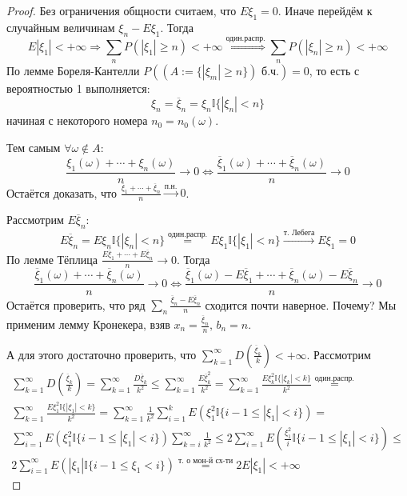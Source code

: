 \begin{proof}
	Без ограничения общности считаем, что $E\xi_1 = 0$. Иначе перейдём к случайным величинам $\xi_n - E\xi_1$. Тогда
	\[E|\xi_1| < +\infty \Rightarrow \sum_n P(|\xi_1| \geq n) < +\infty \stackrel{\text{один.распр.}}{\Leftrightarrow} \sum_n P(|\xi_n| \geq n) < +\infty\]
	По лемме Бореля-Кантелли $P((A:= \{|\xi_m| \geq n\}) \text{ б.ч.}) = 0$, то есть с вероятностью 1 выполняется:
	\[\xi_n = \overline{\xi}_n = \xi_n\mathbb{I}\{|\xi_n| < n\}\]
	начиная с некоторого номера $n_0 = n_0(\omega)$.

	Тем самым $\forall \omega \not\in A$:
	\[\frac{\xi_1(\omega) + \cdots + \xi_n(\omega)}{n} \to 0 \Leftrightarrow \frac{\overline{\xi}_1(\omega) + \cdots + \overline{\xi}_n(\omega)}{n} \to 0\]
	Остаётся доказать, что $\frac{\overline{\xi}_1 + \cdots + \overline{\xi}_n}{n} \stackrel{\text{п.н.}}{\to} 0$.

	Рассмотрим $E\overline{\xi}_n$:
	\[E\overline{\xi}_n = E\xi_n\mathbb{I}\{|\xi_n| < n\} \stackrel{\text{один.распр.}}{=} E\xi_1\mathbb{I}\{|\xi_1| < n\} \stackrel{\text{т. Лебега}}{\to} E\xi_1 = 0\]
	По лемме Тёплица $\frac{E\overline{\xi}_1 + \cdots + E\overline{\xi}_n}{n} \to 0$. Тогда
	\[\frac{\overline{\xi}_1(\omega) + \cdots + \overline{\xi}_n(\omega)}{n} \to 0 \Leftrightarrow \frac{\overline{\xi}_1(\omega) - E\overline{\xi}_1 + \cdots + \overline{\xi}_n(\omega) - E\overline{\xi}_n}{n} \to 0\]
	Остаётся проверить, что ряд $\sum_n \frac{\overline{\xi}_n - E\overline{\xi}_n}{n}$ сходится почти наверное. Почему? Мы применим лемму Кронекера, взяв $x_n = \frac{\overline{\xi}_n}{n},\, b_n = n$.

	А для этого достаточно проверить, что $\sum_{k = 1}^\infty D\left(\frac{\overline{\xi}_k}{k}\right) < +\infty$. Рассмотрим
	\begin{align*}
		\sum_{k = 1}^\infty D\left(\frac{\overline{\xi}_k}{k}\right) = \sum_{k = 1}^\infty \frac{D\overline{\xi}_k}{k^2} \leq \sum_{k = 1}^\infty \frac{E\overline{\xi}_k^2}{k^2} = \sum_{k = 1}^\infty \frac{E\xi_k^2\mathbb{I}\{|\xi_k| < k\}}{k^2} \stackrel{\text{один.распр.}}{=} \\
		\sum_{k = 1}^\infty \frac{E\xi_1^2\mathbb{I}\{|\xi_1| < k\}}{k^2} = \sum_{k = 1}^\infty \frac{1}{k^2}\sum_{i = 1}^k E\left(\xi_1^2\mathbb{I}\{i - 1 \leq |\xi_1| < i\}\right) =                                                                                                \\
		\sum_{i = 1}^\infty E\left(\xi_1^2\mathbb{I}\{i - 1 \leq |\xi_1| < i\}\right) \sum_{k = i}^\infty \frac{1}{k^2} \leq 2\sum_{i = 1}^\infty E\left(\frac{\xi_1^2}{i}\mathbb{I}\{i - 1 \leq |\xi_1| < i\}\right) \leq                                                             \\
		2 \sum_{i = 1}^\infty E(|\xi_1|\mathbb{I}\{i - 1 \leq \xi_1 < i\}) \stackrel{\text{т. о мон-й сх-ти}}{=} 2E|\xi_1| < +\infty
	\end{align*}
\end{proof}


